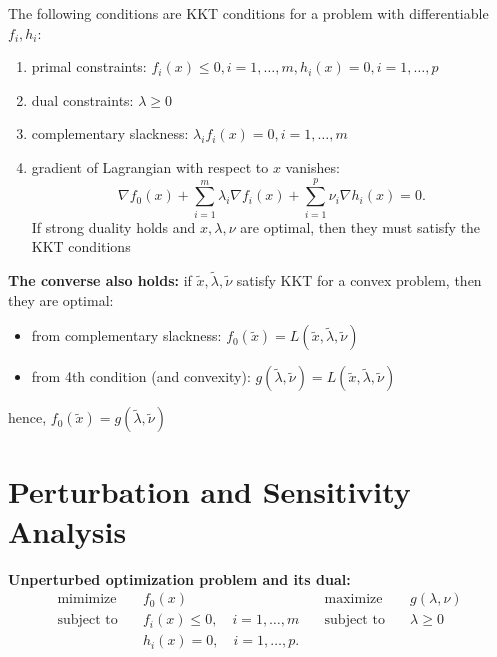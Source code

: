 \documentclass{report}
\theoremstyle{remark} \newtheorem{remark}{Remark}[section]
\theoremstyle{definition}
\theoremstyle{definition}
\theoremstyle{definition}
\theoremstyle{remark}
\begin{document}
The following conditions are KKT conditions for a problem with differentiable $f_i, h_i$:
 \begin{enumerate}
     \item primal constraints: $f_i(x) \le  0, i=1,\ldots,m, h_i(x)=0,i=1,\ldots,p$
         \item dual constraints: $\lambda\ge 0$
             \item complementary slackness: $\lambda_i f_i(x)=0, i=1,\ldots,m$
                 \item gradient of Lagrangian with respect to $x$ vanishes:
                     \[
                     \nabla f_0(x) + \sum_{i=1}^{m} \lambda_i\nabla f_i(x)+\sum_{i=1}^{p} \nu_i\nabla h_i(x)=0
                     .\] 
                     If strong duality holds and $x, \lambda,\nu$ are optimal, then they must satisfy the KKT conditions
    
\end{enumerate}

\textbf{The converse also holds:} if $\tilde{x}, \tilde{\lambda},\tilde{\nu}$ satisfy KKT for a convex problem, then they are optimal:
\begin{itemize}
    \item from complementary slackness: $f_0(\tilde{x})=L(\tilde{x},\tilde{\lambda},\tilde{\nu})$
        \item from 4th condition (and convexity): $g(\tilde{\lambda},\tilde{\nu})=L(\tilde{x},\tilde{\lambda},\tilde{\nu})$
\end{itemize}
hence, $f_0(\tilde{x})=g(\tilde{\lambda},\tilde{\nu})$

\section{Perturbation and Sensitivity Analysis}
\textbf{Unperturbed optimization problem and its dual:}
\begin{align*}
    \text{mimimize} \quad &f_0(x) &\text{maximize}\quad &g(\lambda,\nu) \\
    \text{subject to} \quad &f_i(x) \le 0, \quad i=1,\ldots,m \quad &\text{subject to}\quad &\lambda\ge 0  \\
                            &h_i(x)=0, \quad i=1,\ldots,p
.\end{align*}
\end{document}
